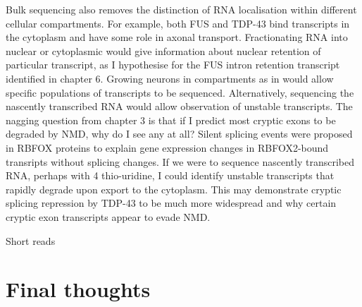 Bulk sequencing also removes the distinction of RNA localisation within different cellular compartments. %
For example, both FUS and TDP-43 bind transcripts in the cytoplasm and have some role in axonal transport. %
Fractionating RNA into nuclear or cytoplasmic would give information about nuclear retention of particular transcript, as I hypothesise for the FUS intron retention transcript identified in chapter 6.
Growing neurons in compartments as in \citep{Taliaferro2016} would allow specific populations of transcripts to be sequenced.
Alternatively, sequencing the nascently transcribed RNA would allow observation of unstable transcripts.
The nagging question from chapter 3 is that if I predict most cryptic exons to be degraded by NMD, why do I see any at all?
Silent splicing events were proposed in RBFOX proteins \citep{Jangi2014} to explain gene expression changes in RBFOX2-bound transripts without splicing changes.
If we were to sequence nascently transcribed RNA, perhaps with 4 thio-uridine, I could identify unstable transcripts that rapidly degrade upon export to the cytoplasm.
This may demonstrate cryptic splicing repression by TDP-43 to be much more widespread and why certain cryptic exon transcripts appear to evade NMD.




Short reads






\section{Final thoughts}



